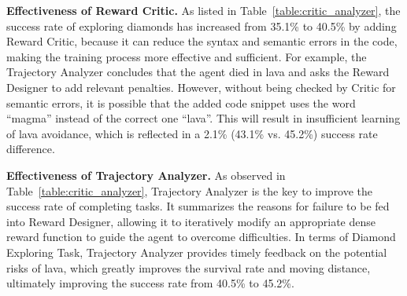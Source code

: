 \noindent\textbf{Effectiveness of Reward Critic.}
As listed in Table~\ref{table:critic_analyzer}, the success rate of exploring diamonds has increased from 35.1\% to 40.5\% by adding Reward Critic, because it can reduce the syntax and semantic errors in the code,
making the training process more effective and sufficient.
For example, the Trajectory Analyzer concludes that the agent died in lava and asks the Reward Designer to add relevant penalties. However, without being checked by Critic for semantic errors, it is possible that the added code snippet uses the word ``magma'' instead of the correct one ``lava''. This will result in insufficient learning of lava avoidance, which is reflected in a 2.1\% (43.1\% vs. 45.2\%) success rate difference.

\noindent\textbf{Effectiveness of Trajectory Analyzer.}
As observed in Table~\ref{table:critic_analyzer}, Trajectory Analyzer is the key to improve the success rate of completing tasks. It summarizes the reasons for failure to be fed into Reward Designer, allowing it to iteratively modify an appropriate dense reward function to guide the agent to overcome difficulties. In terms of Diamond Exploring Task, Trajectory Analyzer provides timely feedback on the potential risks of lava, which greatly improves the survival rate and moving distance, ultimately improving the success rate from 40.5\% to 45.2\%.

